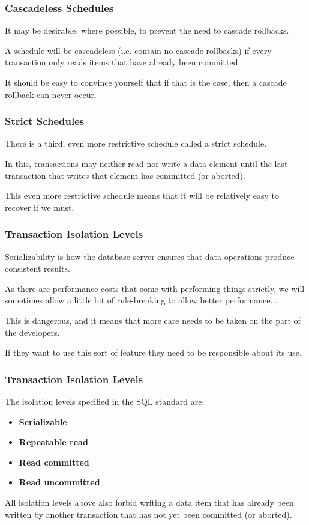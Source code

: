\begin{frame}
\frametitle{Cascadeless Schedules}

It may be desirable, where possible, to prevent the need to cascade rollbacks. 

A schedule will be \alert{cascadeless} (i.e. contain no cascade rollbacks) if every transaction only reads items that have already been committed. 

It should be easy to convince yourself that if that is the case, then a cascade rollback can never occur. 


\end{frame}

\begin{frame}
\frametitle{Strict Schedules}

There is a third, even more restrictive schedule called a \alert{strict schedule}.

In this, transactions may neither read nor write a data element until the last transaction that writes that element has committed (or aborted).

This even more restrictive schedule means that it will be relatively easy to recover if we must.

\end{frame}

\begin{frame}
\frametitle{Transaction Isolation Levels}

Serializability is how the database server ensures that data operations produce consistent results. 

As there are performance costs that come with performing things strictly, we will sometimes allow a little bit of rule-breaking to allow better performance... 

This is dangerous, and it means that more care needs to be taken on the part of the developers. 

If they want to use this sort of feature they need to be responsible about its use.


\end{frame}

\begin{frame}
\frametitle{Transaction Isolation Levels}

The isolation levels specified in the SQL standard are:
\begin{itemize}
	\item \textbf{Serializable}
	\item \textbf{Repeatable read}
	\item \textbf{Read committed}
	\item \textbf{Read uncommitted}
\end{itemize}

All isolation levels above also forbid writing a data item that has already been written by another transaction that has not yet been committed (or aborted).

\end{frame}

